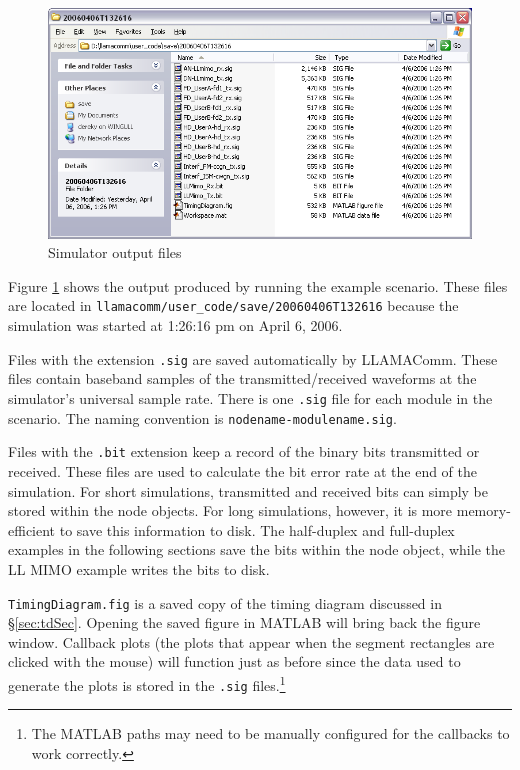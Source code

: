 \begin{figure}[h]
\centering
\includegraphics[width=5in]{figs/Save_Files}
\caption{Simulator output files}
\label{fig:saveFiles}
\end{figure}

Figure \ref{fig:saveFiles} shows the output produced by running the
example scenario.  These files are located in
\verb+llamacomm/user_code/save/20060406T132616+ because the simulation was
started at 1:26:16 pm on April 6, 2006.

Files with the extension \verb+.sig+ are saved automatically by
LLAMAComm. These files contain baseband samples of the
transmitted/received waveforms at the simulator's universal sample
rate.  There is one \verb+.sig+ file for each module in the
scenario. The naming convention is \verb+nodename-modulename.sig+.

Files with the \verb+.bit+ extension keep a record of the binary
bits transmitted or received.  These files are used to calculate the
bit error rate at the end of the simulation.  For short simulations,
transmitted and received bits can simply be stored within the node
objects.  For long simulations, however, it is more memory-efficient
to save this information to disk.  The half-duplex and full-duplex
examples in the following sections save the bits within the node
object, while the LL MIMO example writes the bits to disk.

\verb+TimingDiagram.fig+ is a saved copy of the timing diagram
discussed in \S\ref{sec:tdSec}.  Opening the saved figure in MATLAB
will bring back the figure window.  Callback plots (the plots that
appear when the segment rectangles are clicked with the mouse) will
function just as before since the data used to generate the plots is
stored in the \verb+.sig+ files.\footnote{The MATLAB paths may need
to be manually configured for the callbacks to work correctly.}

